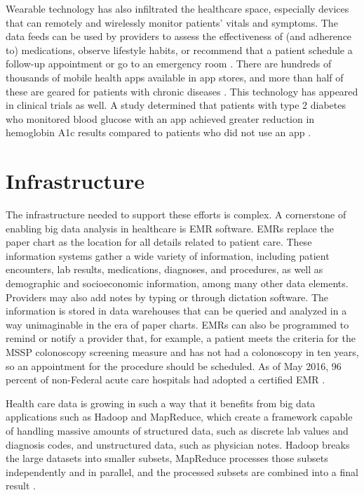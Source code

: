 \documentclass[sigconf]{acmart}
\begin{document}
 Wearable technology has also infiltrated the healthcare space, especially devices that can remotely and wirelessly monitor patients' vitals and symptoms. The data feeds can be used by providers to assess the effectiveness of (and adherence to) medications, observe lifestyle habits, or recommend that a patient schedule a follow-up appointment or go to an emergency room \cite{editor09}. There are hundreds of thousands of mobile health apps available in app stores, and more than half of these are geared for patients with chronic diseases \cite{editor09}. This technology has appeared in clinical trials as well. A study determined that patients with type 2 diabetes who monitored blood glucose with an app achieved greater reduction in hemoglobin A1c results compared to patients who did not use an app \cite{editor10}.

\section{Infrastructure}

 The infrastructure needed to support these efforts is complex. A cornerstone of enabling big data analysis in healthcare is EMR software. EMRs replace the paper chart as the location for all details related to patient care. These information systems gather a wide variety of information, including patient encounters, lab results, medications, diagnoses, and procedures, as well as demographic and socioeconomic information, among many other data elements. Providers may also add notes by typing or through dictation software. The information is stored in data warehouses that can be queried and analyzed in a way unimaginable in the era of paper charts. EMRs can also be programmed to remind or notify a provider that, for example, a patient meets the criteria for the MSSP colonoscopy screening measure and has not had a colonoscopy in ten years, so an appointment for the procedure should be scheduled. As of May 2016, 96 percent of non-Federal acute care hospitals had adopted a certified EMR \cite{editor15}.

 Health care data is growing in such a way that it benefits from  big data applications such as Hadoop and MapReduce, which create a framework capable of handling massive amounts of structured data, such as discrete lab values and diagnosis codes, and unstructured data, such as physician notes. Hadoop breaks the large datasets into smaller subsets, MapReduce processes those subsets independently and in parallel, and the processed subsets are combined into a final result \cite{editor13}.
\end{document}
